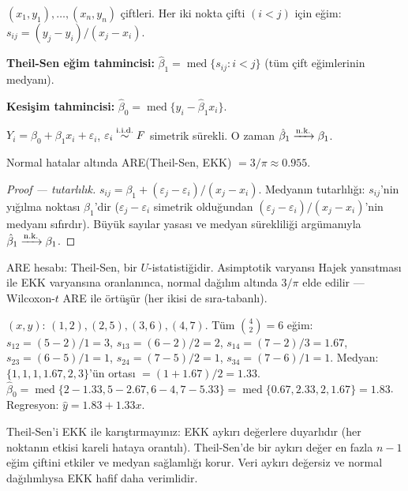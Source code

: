 \begin{tanim}\label{def:theil_sen}
$(x_1,y_1),\ldots,(x_n,y_n)$ çiftleri. Her iki nokta çifti $(i<j)$ için eğim: $s_{ij}=(y_j-y_i)/(x_j-x_i)$.

\textbf{Theil-Sen eğim tahmincisi:} $\hat\beta_1 = \operatorname{med}\{s_{ij}: i<j\}$ (tüm çift eğimlerinin medyanı).

\textbf{Kesişim tahmincisi:} $\hat\beta_0 = \operatorname{med}\{y_i - \hat\beta_1 x_i\}$.
\end{tanim}

\begin{teorem}\label{thm:theil_sen}
$Y_i = \beta_0 + \beta_1 x_i + \varepsilon_i$, $\varepsilon_i\overset{\text{i.i.d.}}{\sim} F$ simetrik sürekli. O zaman $\hat\beta_1\xrightarrow{\text{n.k.}}\beta_1$.

Normal hatalar altında ARE(Theil-Sen, EKK) $= 3/\pi \approx 0.955$.
\end{teorem}

\begin{proof}[Proof --- tutarlılık]
$s_{ij} = \beta_1 + (\varepsilon_j-\varepsilon_i)/(x_j-x_i)$. Medyanın tutarlılığı: $s_{ij}$'nin yığılma noktası $\beta_1$'dir ($\varepsilon_j-\varepsilon_i$ simetrik olduğundan $(\varepsilon_j-\varepsilon_i)/(x_j-x_i)$'nin medyanı sıfırdır). Büyük sayılar yasası ve medyan sürekliliği argümanıyla $\hat\beta_1\xrightarrow{\text{n.k.}}\beta_1$.
\end{proof}

\begin{ispatiskele}
ARE hesabı: Theil-Sen, bir $U$-istatistiğidir. Asimptotik varyansı Hajek yansıtması ile EKK varyansına oranlanınca, normal dağılım altında $3/\pi$ elde edilir --- Wilcoxon-$t$ ARE ile örtüşür (her ikisi de sıra-tabanlı).
\end{ispatiskele}

\begin{ornek}
$(x,y)$: $(1,2),(2,5),(3,6),(4,7)$. Tüm $\binom{4}{2}=6$ eğim:
$s_{12}=(5-2)/1=3$, $s_{13}=(6-2)/2=2$, $s_{14}=(7-2)/3=1.67$,
$s_{23}=(6-5)/1=1$, $s_{24}=(7-5)/2=1$, $s_{34}=(7-6)/1=1$.
Medyan: $\{1,1,1,1.67,2,3\}$'ün ortası $=(1+1.67)/2=1.33$.
$\hat\beta_0=\operatorname{med}\{2-1.33,5-2.67,6-4,7-5.33\}=\operatorname{med}\{0.67,2.33,2,1.67\}=1.83$.
Regresyon: $\hat{y}=1.83+1.33x$.
\end{ornek}

\begin{hataanalizi}
Theil-Sen'i EKK ile karıştırmayınız: EKK aykırı değerlere duyarlıdır (her noktanın etkisi kareli hataya orantılı). Theil-Sen'de bir aykırı değer en fazla $n-1$ eğim çiftini etkiler ve medyan sağlamlığı korur. Veri aykırı değersiz ve normal dağılımlıysa EKK hafif daha verimlidir.
\end{hataanalizi}

